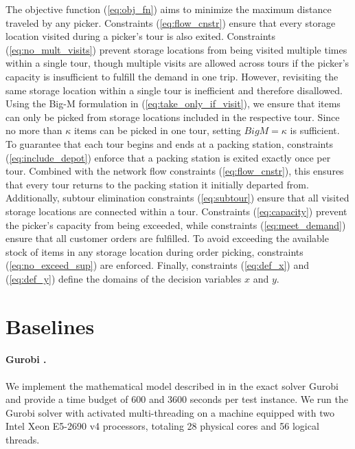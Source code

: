 %

The objective function (\ref{eq:obj_fn}) aims to minimize the maximum distance traveled by any picker. Constraints (\ref{eq:flow_cnstr}) ensure that every storage location visited during a picker’s tour is also exited. Constraints (\ref{eq:no_mult_visits}) prevent storage locations from being visited multiple times within a single tour, though multiple visits are allowed across tours if the picker's capacity is insufficient to fulfill the demand in one trip. However, revisiting the same storage location within a single tour is inefficient and therefore disallowed.
Using the Big-M formulation in (\ref{eq:take_only_if_visit}), we ensure that items can only be picked from storage locations included in the respective tour. Since no more than $\kappa$ items can be picked in one tour, setting $BigM=\kappa$ is sufficient.
To guarantee that each tour begins and ends at a packing station, constraints (\ref{eq:include_depot}) enforce that a packing station is exited exactly once per tour. Combined with the network flow constraints (\ref{eq:flow_cnstr}), this ensures that every tour returns to the packing station it initially departed from. Additionally, subtour elimination constraints (\ref{eq:subtour}) ensure that all visited storage locations are connected within a tour.
Constraints (\ref{eq:capacity}) prevent the picker's capacity from being exceeded, while constraints (\ref{eq:meet_demand}) ensure that all customer orders are fulfilled. To avoid exceeding the available stock of items in any storage location during order picking, constraints (\ref{eq:no_exceed_sup}) are enforced. Finally, constraints (\ref{eq:def_x}) and (\ref{eq:def_y}) define the domains of the decision variables $x$ and $y$.


\section{Baselines}
\label{appendix:baselines}

\paragraph{Gurobi \cite{gurobi}.}
We implement the mathematical model described in  in the exact solver Gurobi \cite{gurobi} and provide a time budget of 600 and 3600 seconds per test instance. We run the Gurobi solver with activated multi-threading on a machine equipped with two Intel Xeon E5-2690 v4 processors, totaling 28 physical cores and 56 logical threads.

